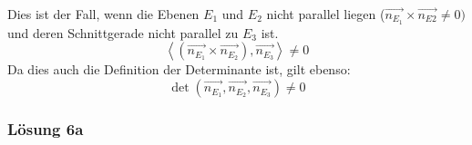 \documentclass[main.tex]{subfiles}
\begin{document}
Dies ist der Fall, wenn die Ebenen $E_{1}$ und $E_{2}$ nicht parallel liegen ($\overrightarrow{n_{E_{1}}} \times \overrightarrow{n_{E2}} \neq 0)$ und deren Schnittgerade nicht parallel zu $E_{3}$ ist.
\begin{equation*}
\left< \left(\overrightarrow{n_{E_{1}}} \times \overrightarrow{n_{E_{2}}}\right) ,\overrightarrow{n_{E_{3}}}\right> \neq 0
\end{equation*}
Da dies auch die Definition der Determinante ist, gilt ebenso:
\begin{equation*}
\det\left(\overrightarrow{n_{E_{1}}} ,\overrightarrow{n_{E_{2}}} ,\overrightarrow{n_{E_{3}}}\right) \neq 0
\end{equation*}

\subsubsection{Lösung 6a}
\end{document}
